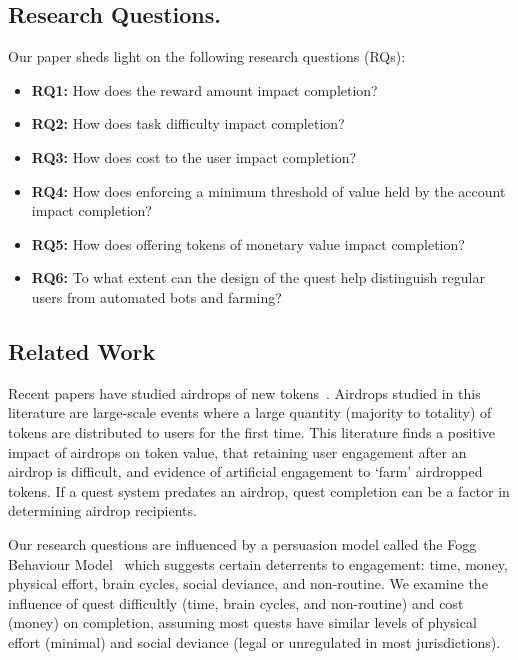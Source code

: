 
\subsection{Research Questions.} 
Our paper sheds light on the following research questions (RQs):

\begin{itemize}
\item \textbf{RQ1:} How does the reward amount impact completion?
\item \textbf{RQ2:} How does task difficulty impact completion?
\item \textbf{RQ3:} How does cost to the user impact completion?
\item \textbf{RQ4:} How does enforcing a minimum threshold of value held by the account impact completion?
\item \textbf{RQ5:} How does offering tokens of monetary value impact completion?
\item \textbf{RQ6:} To what extent can the design of the quest help distinguish regular users from automated bots and farming?
\end{itemize}


\subsection{Related Work}

Recent papers have studied airdrops of new tokens~\cite{FB19,MYL24,YL24}. Airdrops studied in this literature are large-scale events where a large quantity (majority to totality) of tokens are distributed to users for the first time. This literature finds a positive impact of airdrops on token value, that retaining user engagement after an airdrop is difficult, and evidence of artificial engagement to `farm' airdropped tokens. If a quest system predates an airdrop, quest completion can be a factor in determining airdrop recipients. 

Our research questions are influenced by a persuasion model called the Fogg Behaviour Model~\cite{Fogg09} which suggests certain deterrents to engagement: time, money, physical effort, brain cycles, social deviance, and non-routine. We examine the influence of quest difficultly (time, brain cycles, and non-routine) and cost (money) on completion, assuming most quests have similar levels of physical effort (minimal) and social deviance (legal or unregulated in most jurisdictions). 

